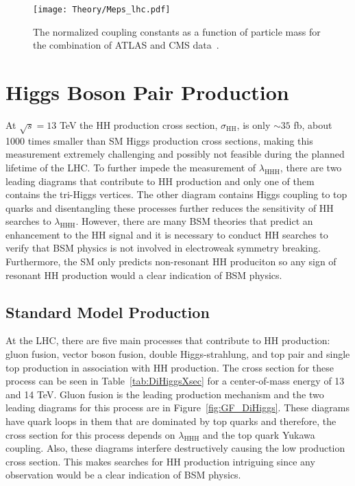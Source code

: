 \begin{figure}[h!]
 \centering
 \texttt{[image: Theory/Meps\_lhc.pdf]}
\caption{The normalized coupling constants as a function of particle mass for the combination of ATLAS and CMS data~\cite{HiggsProperties}.}
\label{fig:HiggsCouplingMeasurement}
\end{figure}


\section{Higgs Boson Pair Production}
\label{sec:HHprod}

At $\sqrt{s}=13$ TeV the HH production cross section, $\sigma_{\mathrm{HH}}$, is only ${\sim}35$ fb, about 1000 times smaller than SM Higgs production cross sections, making this measurement extremely challenging and possibly not feasible during the planned lifetime of the LHC. To further impede the measurement of $\lambda_{\mathrm{HHH}}$, there are two leading diagrams that contribute to HH production and only one of them contains the tri-Higgs vertices. The other diagram contains Higgs coupling to top quarks and disentangling these processes further reduces the sensitivity of HH searches to $\lambda_{\mathrm{HHH}}$. However, there are many BSM theories that predict an enhancement to the HH signal and it is necessary to conduct HH searches to verify that BSM physics is not involved in electroweak symmetry breaking. Furthermore, the SM only predicts non-resonant HH produciton so any sign of resonant HH production would a clear indication of BSM physics.


\subsection{Standard Model Production}
At the LHC, there are five main processes that contribute to HH production: gluon fusion, vector boson fusion, double Higgs-strahlung, and top pair and single top production in association with HH production. The cross section for these process can be seen in Table~\ref{tab:DiHiggsXsec} for a center-of-mass energy of 13 and 14 TeV. Gluon fusion is the leading production mechanism and the two leading diagrams for this process are in Figure~\ref{fig:GF_DiHiggs}. These diagrams have quark loops in them that are dominated by top quarks and therefore, the cross section for this process depends on $\lambda_{\mathrm{HHH}}$ and the top quark Yukawa coupling. Also, these diagrams interfere destructively causing the low production cross section. This makes searches for HH production intriguing since any observation would be a clear indication of BSM physics.



